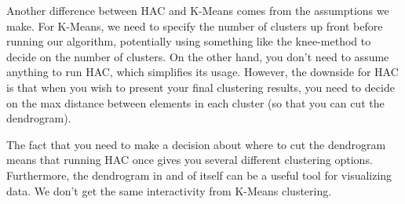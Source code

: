 Another difference between HAC and K-Means comes from the assumptions we make. For K-Means, we need to specify the number of clusters up front before running our algorithm, potentially using something like the knee-method to decide on the number of clusters. On the other hand, you don't need to assume anything to run HAC, which simplifies its usage. However, the downside for HAC is that when you wish to present your final clustering results, you need to decide on the max distance between elements in each cluster (so that you can cut the dendrogram).

The fact that you need to make a decision about where to cut the dendrogram means that running HAC once gives you several different clustering options. Furthermore, the dendrogram in and of itself can be a useful tool for visualizing data. We don't get the same interactivity from K-Means clustering.


